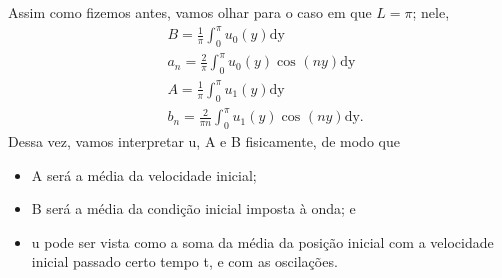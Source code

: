 \documentclass[../pde_notes.tex]{subfiles}
\begin{document}
\begin{example}
	Assim como fizemos antes, vamos olhar para o caso em que \(L = \pi \); nele,
	\begin{align*}
		 & B = \frac{1}{\pi }\int_{0}^{\pi } u_{0}(y)\mathrm{dy}                    \\
		 & a_{n} = \frac{2}{\pi }\int_{0}^{\pi }u_{0}(y)\cos^{}{(ny)} \mathrm{dy}   \\
		 & A = \frac{1}{\pi }\int_{0}^{\pi } u_{1}(y)\mathrm{dy}                    \\
		 & b_{n} = \frac{2}{\pi n}\int_{0}^{\pi }u_{1}(y)\cos^{}{(ny)} \mathrm{dy}.
	\end{align*}
	Dessa vez, vamos interpretar u, A e B fisicamente, de modo que
	\begin{itemize}
		\item A será a média da velocidade inicial;
		\item B será a média da condição inicial imposta à onda; e
		\item u pode ser vista como a soma da média da posição inicial com a velocidade inicial passado certo tempo t, e com as oscilações.
	\end{itemize}
\end{example}
\end{document}
